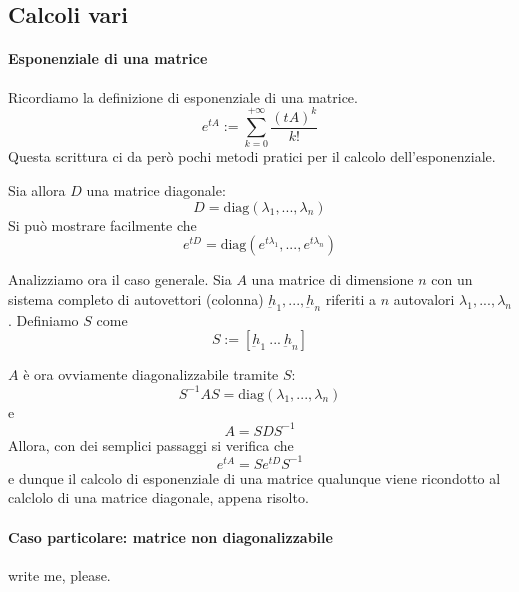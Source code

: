 \documentclass[a4paper,12pt]{article}
\begin{document}
\subsection{Calcoli vari}
\paragraph{Esponenziale di una matrice}
Ricordiamo la definizione di esponenziale di una matrice.
$$e^{tA} := \sum_{k=0}^{+\infty} \dfrac{(tA)^k}{k!}$$
Questa scrittura ci da però pochi metodi pratici per il calcolo dell'esponenziale.

Sia allora $D$ una matrice diagonale:
$$D=\text{diag}(\lambda_1,...,\lambda_n)$$
Si può mostrare facilmente che
$$e^{tD} = \text{diag}(e^{t\lambda_1}, ..., e^{t\lambda_n})$$

Analizziamo ora il caso generale.
Sia $A$ una matrice di dimensione $n$ con un sistema completo di autovettori (colonna) $\underbar{h}_1, ..., \underbar{h}_n$ riferiti a $n$ autovalori $\lambda_1, ..., \lambda_n$. Definiamo $S$ come
$$S:=[\underbar{h}_1\ ...\ \underbar{h}_n]$$

$A$ è ora ovviamente diagonalizzabile tramite $S$:
$$S^{-1}AS=\text{diag}(\lambda_1,...,\lambda_n)$$
e
$$A = SDS^{-1}$$
Allora, con dei semplici passaggi si verifica che
$$e^{tA} = Se^{tD}S^{-1}$$
e dunque il calcolo di esponenziale di una matrice qualunque viene ricondotto al calclolo di una matrice diagonale, appena risolto.
\paragraph{Caso particolare: matrice non diagonalizzabile}
write me, please.
\end{document}
